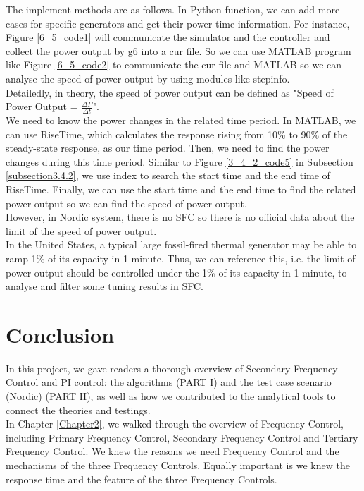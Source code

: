 \documentclass{report}
\begin{document}
The implement methods are as follows. In Python function, we can add more cases for specific generators and get their power-time information. For instance, Figure \textcolor{red}{\ref{6_5_code1}} will communicate the simulator and the controller and collect the power output by g6 into a cur file. So we can use MATLAB program like Figure \textcolor{red}{\ref{6_5_code2}} to communicate the cur file and MATLAB so we can analyse the speed of power output by using modules like stepinfo.\\


Detailedly, in theory, the speed of power output can be defined as "Speed of Power Output = $\frac{\Delta P}{\Delta t}$".\\

We need to know the power changes in the related time period. In MATLAB, we can use RiseTime, which calculates the response rising from 10\% to 90\% of the steady-state response, as our time period. Then, we need to find the power changes during this time period. Similar to Figure \textcolor{red}{\ref{3_4_2_code5}} in Subsection \textcolor{red}{\ref{subsection3.4.2}}, we use index to search the start time and the end time of RiseTime. Finally,  we can use the start time and the end time to find the related power output so we can find the speed of power output.\\


However, in Nordic system, there is no SFC so there is no official data about the limit of the speed of power output. \\

In the United States, a typical large fossil-fired thermal generator may be able to ramp 1\% of its capacity in 1 minute. Thus, we can reference this, i.e. the limit of power output should be controlled under the 1\% of its capacity in 1 minute, to analyse and filter some tuning results in SFC.\\


\chapter{Conclusion}
\label{Chapter7}
In this project, we gave readers a thorough overview of Secondary Frequency Control and PI control: the algorithms (PART I) and the test case scenario (Nordic) (PART II), as well as how we contributed to the analytical tools to connect the theories and testings.\\

In Chapter \textcolor{red}{\ref{Chapter2}}, we walked through the overview of Frequency Control, including Primary Frequency Control, Secondary Frequency Control and Tertiary Frequency Control. We knew the reasons we need Frequency Control and the mechanisms of the three Frequency Controls. Equally important is we knew the response time and the feature of the three Frequency Controls.\\
\end{document}
